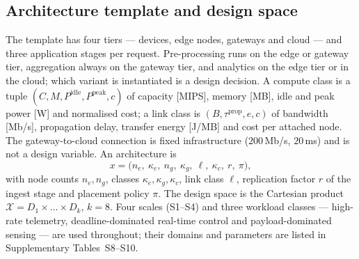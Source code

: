 \documentclass[pdflatex,sn-nature,lineno]{sn-jnl}
\newcommand{\X}{\mathcal{X}}
\begin{document}
\subsection{Architecture template and design space}
The template has four tiers --- devices, edge nodes, gateways and cloud --- and three
application stages per request. Pre-processing runs on the edge or gateway tier,
aggregation always on the gateway tier, and analytics on the edge tier or in the cloud;
which variant is instantiated is a design decision. A compute class is a tuple
$(C,M,P^{\mathrm{idle}},P^{\mathrm{peak}},c)$ of capacity [MIPS], memory [MB], idle and
peak power [W] and normalised cost; a link class is $(B,\tau^{\mathrm{prop}},e,c)$ of
bandwidth [Mb/s], propagation delay, transfer energy [J/MB] and cost per attached node.
The gateway-to-cloud connection is fixed infrastructure ($200$\,Mb/s, $20$\,ms) and is
not a design variable. An architecture is
\begin{equation}
x=\big(n_e,\ \kappa_e,\ n_g,\ \kappa_g,\ \ell,\ \kappa_c,\ r,\ \pi\big),
\label{eq:ce:decision}
\end{equation}
with node counts $n_e,n_g$, classes $\kappa_e,\kappa_g,\kappa_c$, link class $\ell$,
replication factor $r$ of the ingest stage and placement policy $\pi$. The design space is
the Cartesian product $\X=D_1\times\dots\times D_k$, $k=8$. Four scales
(S1--S4) and three workload classes --- high-rate telemetry, deadline-dominated real-time
control and payload-dominated sensing --- are used throughout; their domains and
parameters are listed in Supplementary Tables~S8--S10.
\end{document}
